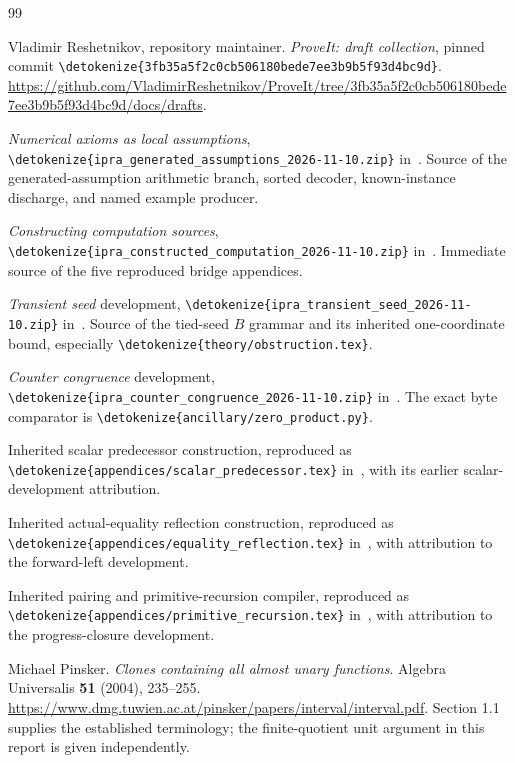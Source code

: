 \documentclass[11pt,letterpaper]{article}
\theoremstyle{definition}\newtheorem{definition}[theorem]{Definition}
\theoremstyle{remark}\newtheorem{remark}[theorem]{Remark}
\newcommand{\file}[1]{\expandafter\nolinkurl\expandafter{\detokenize{#1}}}
\begin{document}






\begin{thebibliography}{99}\raggedright
{}
Vladimir Reshetnikov, repository maintainer.
\emph{ProveIt: draft collection}, pinned commit
\file{3fb35a5f2c0cb506180bede7ee3b9b5f93d4bc9d}.
\url{https://github.com/VladimirReshetnikov/ProveIt/tree/3fb35a5f2c0cb506180bede7ee3b9b5f93d4bc9d/docs/drafts}.

\emph{Numerical axioms as local assumptions},
\file{ipra_generated_assumptions_2026-11-10.zip} in~\cite{snapshot}.
Source of the generated-assumption arithmetic branch, sorted decoder,
known-instance discharge, and named example producer.

\emph{Constructing computation sources},
\file{ipra_constructed_computation_2026-11-10.zip} in~\cite{snapshot}.
Immediate source of the five reproduced bridge appendices.

\emph{Transient seed} development,
\file{ipra_transient_seed_2026-11-10.zip} in~\cite{snapshot}.
Source of the tied-seed $B$ grammar and its inherited one-coordinate
bound, especially \file{theory/obstruction.tex}.

\emph{Counter congruence} development,
\file{ipra_counter_congruence_2026-11-10.zip} in~\cite{snapshot}.
The exact byte comparator is \file{ancillary/zero_product.py}.

Inherited scalar predecessor construction, reproduced as
\file{appendices/scalar_predecessor.tex} in~\cite{constructed}, with
its earlier scalar-development attribution.

Inherited actual-equality reflection construction, reproduced as
\file{appendices/equality_reflection.tex} in~\cite{constructed}, with
attribution to the forward-left development.

Inherited pairing and primitive-recursion compiler, reproduced as
\file{appendices/primitive_recursion.tex} in~\cite{constructed}, with
attribution to the progress-closure development.

Michael Pinsker. \emph{Clones containing all almost unary functions}.
Algebra Universalis \textbf{51} (2004), 235--255.
\url{https://www.dmg.tuwien.ac.at/pinsker/papers/interval/interval.pdf}.
Section 1.1 supplies the established terminology; the finite-quotient
unit argument in this report is given independently.


\end{thebibliography}
\end{document}
